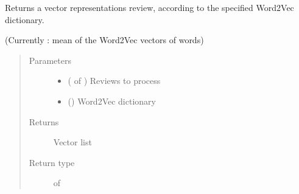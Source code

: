 \documentclass[letterpaper,10pt,english]{sphinxmanual}
\begin{document}
\begin{fulllineitems}
\label{\detokenize{learning:loacore.learning.word_embeddings.review_2_vec}}
Returns a vector representations review, according to the specified Word2Vec dictionary.

(Currently : mean of the Word2Vec vectors of words)
\begin{quote}\begin{description}
\item[{Parameters}] \leavevmode\begin{itemize}
\item {} 
 ( of {\hyperref[\detokenize{classes:loacore.classes.classes.Review}]{}}) \textendash{} Reviews to process

\item {} 
 () \textendash{} Word2Vec dictionary

\end{itemize}

\item[{Returns}] \leavevmode
Vector list

\item[{Return type}] \leavevmode
{} of 

\end{description}\end{quote}

\end{fulllineitems}

\end{document}
